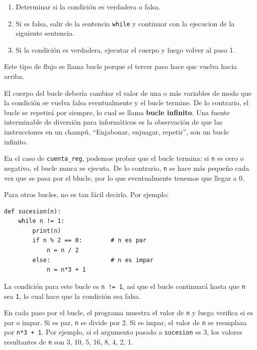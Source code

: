\documentclass[10pt]{book}
\begin{document}
\begin{enumerate}

\item Determinar si la condición es verdadera o falsa.

\item Si es falsa, salir de la sentencia {\tt while}
y continuar con la ejecucion de la siguiente sentencia.

\item Si la condición es verdadera, ejecutar el
cuerpo y luego volver al paso 1.

\end{enumerate}

Este tipo de flujo se llama bucle porque el tercer paso
hace que vuelva hacia arriba.

El cuerpo del bucle debería cambiar el valor de una o más variables
de modo que la condición se vuelva falsa eventualmente y el bucle
termine.  De lo contrario, el bucle se repetirá por siempre, lo cual se llama
{\bf bucle infinito}.  Una fuente interminable de diversión para
informáticos es la observación de que las instrucciones en un champú,
``Enjabonar, enjuagar, repetir'', son un bucle infinito.

En el caso de {\tt cuenta\_reg}, podemos probar que el bucle
termina: si {\tt n} es cero o negativo, el bucle nunca se ejecuta.
De lo contrario, {\tt n} se hace más pequeño cada vez que se pasa por
el blucle, por lo que eventualmente tenemos que llegar a 0.

Para otros bucles, no es tan fácil decirlo.  Por ejemplo:

\begin{verbatim}
def sucesion(n):
    while n != 1:
        print(n)
        if n % 2 == 0:        # n es par
            n = n / 2
        else:                 # n es impar
            n = n*3 + 1
\end{verbatim}
%
La condición para este bucle es {\tt n != 1}, así que el bucle continuará
hasta que {\tt n} sea {\tt 1}, lo cual hace que la condición sea falsa.

En cada paso por el bucle, el programa muestra el valor de {\tt n}
y luego verifica si es par o impar.  Si es par, {\tt n} se
divide por 2.  Si es impar, el valor de {\tt n} se reemplaza por
{\tt n*3 + 1}. Por ejemplo, si el argumento pasado a {\tt sucesion}
es 3, los valores resultantes de {\tt n} son 3, 10, 5, 16, 8, 4, 2, 1.
\end{document}

